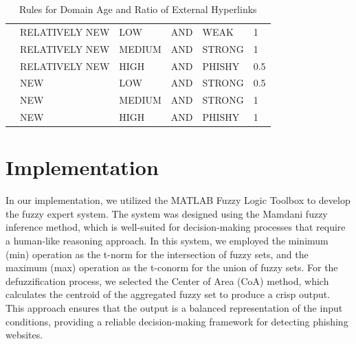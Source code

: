 \documentclass[11pt]{article}
\begin{document}
\begin{table}[H]
\begin{tabular}{llllll}
    \multicolumn{1}{l|}{} & \multicolumn{1}{l|}{RELATIVELY NEW} & \multicolumn{1}{l|}{LOW}                 & \multicolumn{1}{l|}{AND}      & \multicolumn{1}{l|}{WEAK}          & \multicolumn{1}{l|}{1}      \\ \cline{2-6} 
    \multicolumn{1}{l|}{} & \multicolumn{1}{l|}{RELATIVELY NEW} & \multicolumn{1}{l|}{MEDIUM}              & \multicolumn{1}{l|}{AND}      & \multicolumn{1}{l|}{STRONG}        & \multicolumn{1}{l|}{1}      \\ \cline{2-6} 
    \multicolumn{1}{l|}{} & \multicolumn{1}{l|}{RELATIVELY NEW} & \multicolumn{1}{l|}{HIGH}                & \multicolumn{1}{l|}{AND}      & \multicolumn{1}{l|}{PHISHY}        & \multicolumn{1}{l|}{0.5}    \\ \cline{2-6} 
    \multicolumn{1}{l|}{} & \multicolumn{1}{l|}{NEW}            & \multicolumn{1}{l|}{LOW}                 & \multicolumn{1}{l|}{AND}      & \multicolumn{1}{l|}{STRONG}        & \multicolumn{1}{l|}{0.5}    \\ \cline{2-6} 
    \multicolumn{1}{l|}{} & \multicolumn{1}{l|}{NEW}            & \multicolumn{1}{l|}{MEDIUM}              & \multicolumn{1}{l|}{AND}      & \multicolumn{1}{l|}{STRONG}        & \multicolumn{1}{l|}{1}      \\ \cline{2-6} 
    \multicolumn{1}{l|}{} & \multicolumn{1}{l|}{NEW}            & \multicolumn{1}{l|}{HIGH}                & \multicolumn{1}{l|}{AND}      & \multicolumn{1}{l|}{PHISHY}        & \multicolumn{1}{l|}{1}      \\ \cline{2-6} 
    \end{tabular}
    \caption{Rules for Domain Age and Ratio of External Hyperlinks}
    \label{domainage_hyperlinks_rules}
\end{table}




\section{Implementation}
In our implementation, we utilized the MATLAB Fuzzy Logic Toolbox to develop the fuzzy expert system. The system was designed using the Mamdani fuzzy inference method, which is well-suited for decision-making processes that require a human-like reasoning approach. In this system, we employed the minimum (min) operation as the t-norm for the intersection of fuzzy sets, and the maximum (max) operation as the t-conorm for the union of fuzzy sets. For the defuzzification process, we selected the Center of Area (CoA) method, which calculates the centroid of the aggregated fuzzy set to produce a crisp output. This approach ensures that the output is a balanced representation of the input conditions, providing a reliable decision-making framework for detecting phishing websites.
\end{document}
